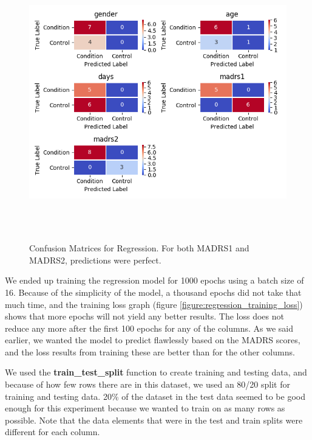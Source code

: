 \begin{figure}
\begin{center}
      \includegraphics[height=12cm]{img/regression/confusion_kerasregressor_grouped.png}
      \caption{Confusion Matrices for Regression. For both MADRS1 and MADRS2, predictions were perfect.}
      \label{figure:regression_test_confusion}
\end{center}
\end{figure}

We ended up training the regression model for 1000 epochs using a batch size of 16. Because of the simplicity of the model, a thousand epochs did not take that much time, and the training loss graph (figure \ref{figure:regression_training_loss}) shows that more epochs will not yield any better results. The loss does not reduce any more after the first 100 epochs for any of the columns. As we said earlier, we wanted the model to predict flawlessly based on the MADRS scores, and the loss results from training these are better than for the other columns. 

We used the \textbf{train\_test\_split} function to create training and testing data, and because of how few rows there are in this dataset, 
we used an 80/20 split for training and testing data. 20\% of the dataset in the test data seemed to be good enough for this experiment because we wanted to train on as many rows as possible. Note that the data elements that were in the test and train splits were different for each column. 

